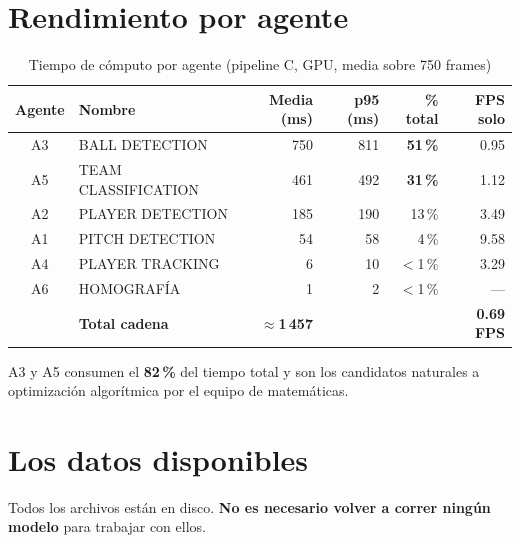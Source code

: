 \documentclass[11pt,a4paper]{article}
\begin{document}
\section{Rendimiento por agente}

\begin{table}[H]
\centering
\caption{Tiempo de cómputo por agente (pipeline C, GPU, media sobre 750 frames)}
\label{tab:rendimiento}
\begin{tabular}{clrrrr}
\toprule
\textbf{Agente} & \textbf{Nombre} & \textbf{Media (ms)} & \textbf{p95 (ms)} & \textbf{\% total} & \textbf{FPS solo} \\
\midrule
A3 & BALL DETECTION     & 750 & 811 & \textbf{51\,\%} & 0.95 \\
A5 & TEAM CLASSIFICATION & 461 & 492 & \textbf{31\,\%} & 1.12 \\
A2 & PLAYER DETECTION   & 185 & 190 & 13\,\%          & 3.49 \\
A1 & PITCH DETECTION    &  54 &  58 &  4\,\%          & 9.58 \\
A4 & PLAYER TRACKING    &   6 &  10 & $<$1\,\%        & 3.29 \\
A6 & HOMOGRAFÍA         &   1 &   2 & $<$1\,\%        & — \\
\midrule
   & \textbf{Total cadena} & \textbf{$\approx$1\,457} & & & \textbf{0.69 FPS} \\
\bottomrule
\end{tabular}
\end{table}

\begin{notabox}
A3 y A5 consumen el \textbf{82\,\%} del tiempo total y son los candidatos
naturales a optimización algorítmica por el equipo de matemáticas.
\end{notabox}

\section{Los datos disponibles}

Todos los archivos están en disco. \textbf{No es necesario volver a correr
ningún modelo} para trabajar con ellos.

\end{document}
